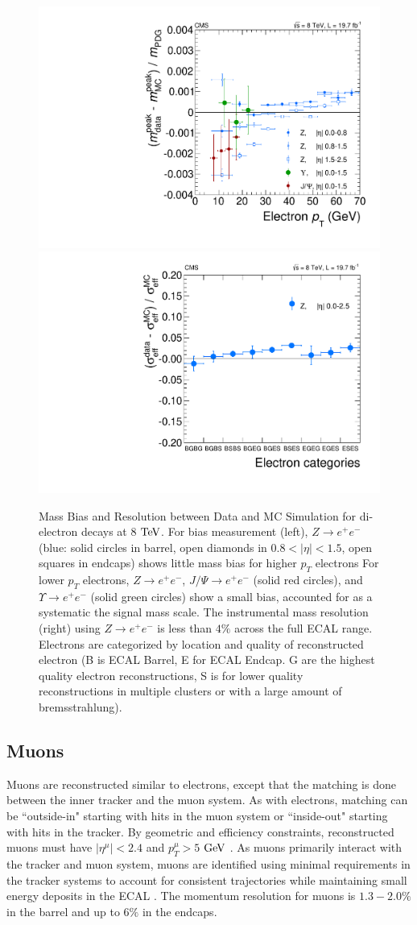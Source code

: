 \begin{figure}[htbp]
\begin{center}
\includegraphics[width=.45\linewidth]{HiggsDiscovery/figures/scale-ptdep-8TeV.pdf}
\includegraphics[width=.45\linewidth]{HiggsDiscovery/figures/electron_resolution.pdf}
\caption[Mass Resolution and Bias from Di-electron Decays]{Mass Bias and Resolution between Data and MC Simulation for di-electron decays at $8$ $\rm{TeV}$. For bias measurement (left), $Z\rightarrow e^+e^-$ (blue: solid circles in barrel, open diamonds in $0.8<|\eta|<1.5$, open squares in endcaps) shows little mass bias for higher $p_T$ electrons For lower $p_T$ electrons, $Z\rightarrow e^+e^-$, $J/\Psi\rightarrow e^+e^-$ (solid red circles), and $\Upsilon\rightarrow e^+e^-$ (solid green circles) show a small bias, accounted for as a systematic the signal mass scale. The instrumental mass resolution (right) using $Z\rightarrow e^+e^-$ is less than $4\%$ across the full ECAL range. Electrons are categorized by location and quality of reconstructed electron (B is ECAL Barrel, E for ECAL Endcap. G are the highest quality electron reconstructions, S is for lower quality reconstructions in multiple clusters or with a large amount of bremsstrahlung).}
\label{fig:ElectronMassResolutionAndBias}
\end{center}
\end{figure}

\subsection{Muons}
\label{sec:zz4lMuons}

Muons are reconstructed similar to electrons, except that the matching is done between the inner tracker and the muon system. As with electrons, matching can be ``outside-in" starting with hits in the muon system or ``inside-out" starting with hits in the tracker. By geometric and efficiency constraints, reconstructed muons must have $|\eta^\mu|<2.4$ and $p_T^\mu>5$ $\rm{GeV}$ \cite{MuonTR:2010}. As muons primarily interact with the tracker and muon system, muons are identified using minimal requirements in the tracker systems to account for consistent trajectories while maintaining small energy deposits in the ECAL \cite{CMS-PAS-PFT-10-003}. The momentum resolution for muons is $1.3-2.0\%$ in the barrel and up to $6\%$ in the endcaps.

